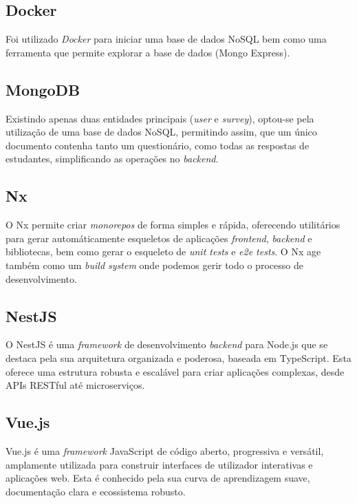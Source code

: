 \documentclass[12pt,a4paper,final]{article}
\begin{document}
    \subsection{Docker}\label{subsec:docker}
    Foi utilizado \textit{Docker} para iniciar uma base de dados NoSQL bem como uma ferramenta que permite explorar a base de dados (Mongo Express).

    \subsection{MongoDB}\label{subsec:mongodb}
    Existindo apenas duas entidades principais (\textit{user} e \textit{survey}), optou-se pela utilização de uma base de dados NoSQL, permitindo assim, que um único documento contenha tanto um questionário, como todas as respostas de estudantes, simplificando as operações no \textit{backend}.

    \subsection{Nx}\label{subsec:nx}
    O Nx permite criar \textit{monorepos} de forma simples e rápida, oferecendo utilitários para gerar automáticamente esqueletos de aplicações \textit{frontend}, \textit{backend} e bibliotecas, bem como gerar o esqueleto de \textit{unit tests} e \textit{e2e tests}.
    O Nx age também como um \textit{build system} onde podemos gerir todo o processo de desenvolvimento.

    \subsection{NestJS}\label{subsec:nestjs}
    O NestJS é uma \textit{framework} de desenvolvimento \textit{backend} para Node.js que se destaca pela sua arquitetura organizada e poderosa, baseada em TypeScript.
    Esta oferece uma estrutura robusta e escalável para criar aplicações complexas, desde APIs RESTful até microserviços.

    \subsection{Vue.js}\label{subsec:vuejs}
    Vue.js é uma \textit{framework} JavaScript de código aberto, progressiva e versátil, amplamente utilizada para construir interfaces de utilizador interativas e aplicações web.
    Esta é conhecido pela sua curva de aprendizagem suave, documentação clara e ecossistema robusto.
\end{document}

